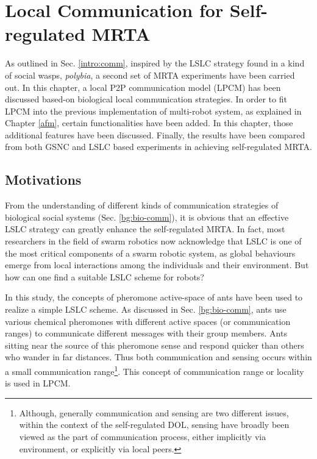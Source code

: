 \chapter{Local Communication for Self-regulated MRTA}
\label{local-comm}
As outlined in Sec. \ref{intro:comm}, inspired by the LSLC strategy found in a kind of social wasps, {\em polybia},  a second set of MRTA experiments have been carried out. In this chapter, a local P2P communication  model (LPCM) has been discussed based-on biological local communication strategies. In order to fit LPCM into the previous implementation of multi-robot system, as explained in Chapter \ref{afm},  certain functionalities  have been added. In this chapter,  those additional features have been discussed. Finally,  the results  have been compared from both GSNC and LSLC based experiments in achieving self-regulated MRTA. 
\section{Motivations}
From the understanding of different kinds of communication strategies of biological social systems (Sec. \ref{bg:bio-comm}), it is obvious that an effective LSLC strategy can greatly enhance the self-regulated MRTA.  In fact, most  researchers in the field of swarm robotics now acknowledge that LSLC is one of the most critical components of a swarm robotic system, as global behaviours emerge from local interactions among the individuals and their environment. But how can one find a suitable LSLC scheme for robots?

In this study, the concepts of pheromone active-space of ants  have been used to realize a simple LSLC scheme. As discussed in Sec. \ref{bg:bio-comm}, ants use various chemical pheromones with different active spaces (or communication ranges) to communicate different messages with their group members. Ants sitting near the source of this pheromone sense and respond quicker than others who wander in far distances. Thus both communication and sensing occurs within a small communication range\footnote{Although, generally communication and sensing are two different issues, within the context of the self-regulated DOL,   sensing have broadly been viewed as the part of communication process, either implicitly via environment, or explicitly via local peers.}. This concept of communication range or locality is used in LPCM.

